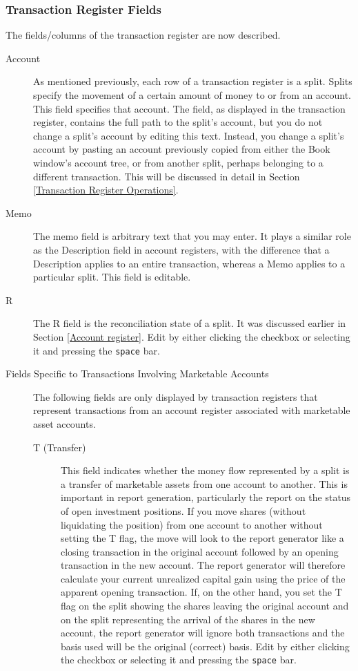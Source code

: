 \documentclass{report}
\begin{document}
\subsubsection{Transaction Register Fields}
The fields/columns of the transaction register are now described.
\begin{description}
\item[Account]
As mentioned previously, each row of a transaction register is a split. Splits specify the movement of a certain amount of money to or from an account. This field specifies that account. The field, as displayed in the transaction register, contains the full path to the split's account, but you do not change a split's account by editing this text. Instead,  you change a split's account by pasting an account previously copied from either the Book window's account tree, or from another split, perhaps belonging to a different transaction. This will be discussed in detail in Section \ref{Transaction Register Operations}.
\item[Memo]
The memo field is arbitrary text that you may enter. It plays a similar role as the Description field in account registers, with the difference that a Description applies to an entire transaction, whereas a Memo applies to a particular split. This field is editable.
\item[R]
The R field is the reconciliation state of a split. It was discussed earlier in Section \ref{Account register}. Edit by either clicking the checkbox or selecting it and pressing the \verb|space| bar.
\item[Fields Specific to Transactions Involving Marketable Accounts] The following fields are only displayed by transaction registers that represent transactions from an account register associated with marketable asset accounts.
\begin{description}
\item [T (Transfer)] This field indicates whether the money flow represented by a split is a transfer of marketable assets from one account to another. This is important in report generation, particularly the report on the status of open investment positions. If you move shares (without liquidating the position) from one account to another without setting the T flag, the move will look to the report generator like a closing transaction in the original account followed by an opening transaction in the new account. The report generator will therefore calculate your current unrealized capital gain using the price of the apparent opening transaction. If, on the other hand, you set the T flag on the split showing the shares leaving the original account and on the split representing the arrival of the shares in the new account, the report generator will ignore both transactions and the basis used will be the original (correct) basis. Edit by either clicking the checkbox or selecting it and pressing the \verb|space| bar.

\end{description}
\end{description}
\end{document}
